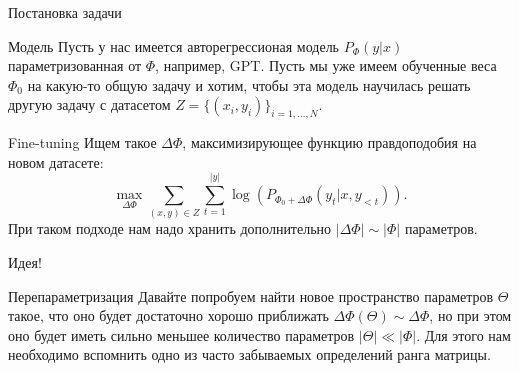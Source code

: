 \documentclass[9pt]{beamer}
\begin{document}
\begin{frame}{Постановка задачи}

    \begin{block}{Модель}
        Пусть у нас имеется авторегрессионая модель $P_{\Phi}(y | x)$ параметризованная от $\Phi$, например, GPT. Пусть мы уже имеем обученные веса $\Phi_0$ на какую-то общую задачу и хотим, чтобы эта модель научилась решать другую задачу с датасетом $Z = \{ (x_i, y_i) \}_{i = 1, \ldots, N}$.
    \end{block}

    \begin{block}{Fine-tuning}
        Ищем такое $\Delta \Phi$, максимизирующее функцию правдоподобия на новом датасете: \[ \max_{\Delta \Phi} \sum_{(x, y) \in Z} \sum_{t = 1}^{|y|} \log \left( P_{\Phi_0 + \Delta \Phi} (y_t | x, y_{< t}) \right) . \] При таком подходе нам надо хранить дополнительно $|\Delta \Phi| \sim |\Phi|$ параметров.
    \end{block}

\end{frame}


\begin{frame}{Идея!}
    
    \begin{block}{Перепараметризация}
        Давайте попробуем найти новое пространство параметров $\Theta$ такое, что оно будет достаточно хорошо приближать $\Delta \Phi (\Theta) \sim \Delta \Phi$, но при этом оно будет иметь сильно меньшее количество параметров $|\Theta| \ll |\Phi|$. Для этого нам необходимо вспомнить одно из часто забываемых определений ранга матрицы.
    \end{block}

\end{frame}
\end{document}
